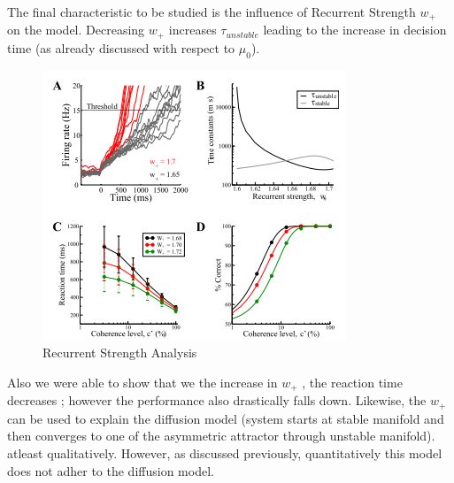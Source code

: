 The final characteristic to be studied is the influence of Recurrent Strength $w_{+}$ on the model. Decreasing $w_{+}$ increases $\tau_{unstable}$ leading to the increase in decision time (as already discussed with respect to $\mu_{0}$).

\begin{figure}
  \includegraphics{fig/RecurrentStrengthAnalysis.jpg}
  \caption{Recurrent Strength Analysis}
  \label{fig:Recurrent Strength Analysis of Reduced Model}
\end{figure}

Also we were able to show that we the increase in $w_{+}$ , the reaction time decreases ; however the performance also drastically falls down. Likewise, the $w_{+}$ can be used to explain the diffusion model (system starts at stable manifold and then converges to one of the asymmetric attractor through unstable manifold). atleast qualitatively. However, as discussed previously, quantitatively this model does not adher to the diffusion model.\\



